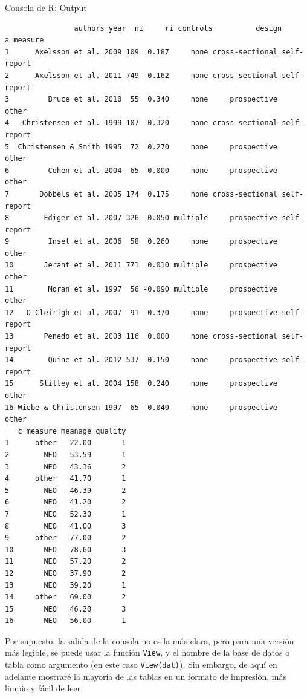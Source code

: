 \documentclass[
  bookmarksnumbered]{article}
\begin{document}
\begin{ROut}{Consola de R: Output~\thetcbcounter}
                \begin{footnotesize}
                \begin{verbatim}                authors year  ni     ri controls          design   a_measure
1      Axelsson et al. 2009 109  0.187     none cross-sectional self-report
2      Axelsson et al. 2011 749  0.162     none cross-sectional self-report
3         Bruce et al. 2010  55  0.340     none     prospective       other
4   Christensen et al. 1999 107  0.320     none cross-sectional self-report
5  Christensen & Smith 1995  72  0.270     none     prospective       other
6         Cohen et al. 2004  65  0.000     none     prospective       other
7       Dobbels et al. 2005 174  0.175     none cross-sectional self-report
8        Ediger et al. 2007 326  0.050 multiple     prospective self-report
9         Insel et al. 2006  58  0.260     none     prospective       other
10       Jerant et al. 2011 771  0.010 multiple     prospective       other
11        Moran et al. 1997  56 -0.090 multiple     prospective       other
12   O'Cleirigh et al. 2007  91  0.370     none     prospective self-report
13       Penedo et al. 2003 116  0.000     none cross-sectional self-report
14        Quine et al. 2012 537  0.150     none     prospective self-report
15      Stilley et al. 2004 158  0.240     none     prospective       other
16 Wiebe & Christensen 1997  65  0.040     none     prospective       other
   c_measure meanage quality
1      other   22.00       1
2        NEO   53.59       1
3        NEO   43.36       2
4      other   41.70       1
5        NEO   46.39       2
6        NEO   41.20       2
7        NEO   52.30       1
8        NEO   41.00       3
9      other   77.00       2
10       NEO   78.60       3
11       NEO   57.20       2
12       NEO   37.90       2
13       NEO   39.20       1
14     other   69.00       2
15       NEO   46.20       3
16       NEO   56.00       1
 \end{verbatim}
                \end{footnotesize}
                \end{ROut}

Por supuesto, la salida de la consola no es la más clara, pero para una versión más legible, se puede usar la función \texttt{View}, y el nombre de la base de datos o tabla como argumento (en este caso \texttt{View(dat)}). Sin embargo, de aquí en adelante mostraré la mayoría de las tablas en un formato de impresión, más limpio y fácil de leer.
\end{document}
